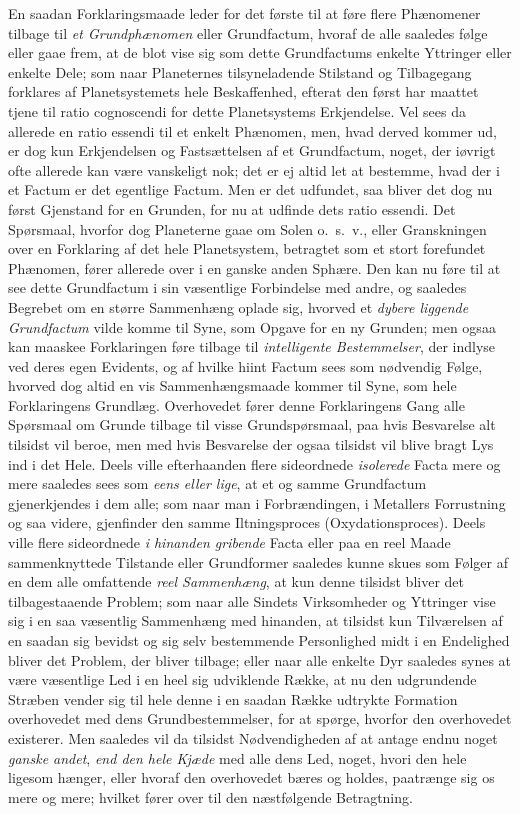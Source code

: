 \documentclass[12pt,a4paper]{book}
\newcommand{\apage}[1]{\marginnote{\footnotesize\textit{[#1]}}}
\begin{document}
En saadan Forklaringsmaade leder for det første til at føre flere Phænomener tilbage til \emph{et Grundphænomen} eller Grundfactum, hvoraf de alle saaledes følge eller gaae frem, at de blot vise sig som dette Grundfactums enkelte Yttringer eller enkelte Dele; som naar Planeternes tilsyneladende Stilstand og Tilbagegang forklares af Planetsystemets hele Beskaffenhed, efterat den først har maattet tjene til ratio cognoscendi for dette Planetsystems Erkjendelse. Vel sees da allerede en ratio essendi til et enkelt Phænomen, men, hvad derved kommer ud, er dog kun Erkjendelsen og Fastsættelsen af et Grundfactum, noget, der iøvrigt ofte allerede kan være vanskeligt  \apage{102} nok; det er ej altid let at bestemme, hvad
der i et Factum er det egentlige Factum. Men er det udfundet, saa bliver det dog
nu først Gjenstand for en Grunden, for nu at udfinde dets ratio essendi. Det
Spørsmaal, hvorfor dog Planeterne gaae om Solen o.\ s.\ v., eller Granskningen
over en Forklaring af det hele Planetsystem, betragtet som et stort forefundet
Phænomen, fører allerede over i en ganske anden Sphære. Den kan nu føre til at see
dette Grundfactum i sin væsentlige Forbindelse med andre, og saaledes Begrebet om
en større Sammenhæng oplade sig, hvorved et \emph{dybere liggende Grundfactum}
vilde komme til Syne, som Opgave for en ny Grunden; men ogsaa kan maaskee
Forklaringen føre tilbage til \emph{intelligente Bestemmelser}, der indlyse ved
deres egen Evidents, og af hvilke hiint Factum sees som nødvendig Følge, hvorved
dog altid en vis Sammenhængsmaade kommer til Syne, som hele Forklaringens
Grundlæg. Overhovedet fører denne Forklaringens Gang alle Spørsmaal om Grunde
tilbage til visse Grundspørsmaal, paa hvis Besvarelse alt tilsidst vil beroe, men
med hvis Besvarelse der ogsaa tilsidst vil blive bragt Lys ind i det Hele. Deels
ville efterhaanden flere sideordnede \emph{isolerede} Facta mere og mere saaledes
sees som \emph{eens eller lige}, at et og samme Grundfactum gjenerkjendes i dem
alle; \apage{103} som naar man i Forbrændingen, i Metallers Forrustning og saa videre,
gjenfinder den samme Iltningsproces (Oxydationsproces). Deels ville flere
sideordnede \emph{i hinanden gribende} Facta eller paa en reel Maade
sammenknyttede Tilstande eller Grundformer saaledes kunne skues som Følger af en
dem alle omfattende \emph{reel Sammenhæng}, at kun denne tilsidst bliver det
tilbagestaaende Problem; som naar alle Sindets Virksomheder og Yttringer vise sig
i en saa væsentlig Sammenhæng med hinanden, at tilsidst kun Tilværelsen af en
saadan sig bevidst og sig selv bestemmende Personlighed midt i en Endelighed
bliver det Problem, der bliver tilbage; eller naar alle enkelte Dyr saaledes
synes at være væsentlige Led i en heel sig udviklende Række, at nu den udgrundende
Stræben vender sig til hele denne i en saadan Række udtrykte Formation overhovedet
med dens Grundbestemmelser, for at spørge, hvorfor den overhovedet existerer. Men
saaledes vil da tilsidst Nødvendigheden af at antage endnu noget \emph{ganske
andet}, \emph{end den hele Kjæde} med alle dens Led, noget, hvori den hele ligesom
hænger, eller hvoraf den overhovedet bæres og holdes, paatrænge sig os mere og
mere; hvilket fører over til den næstfølgende Betragtning.
\end{document}
